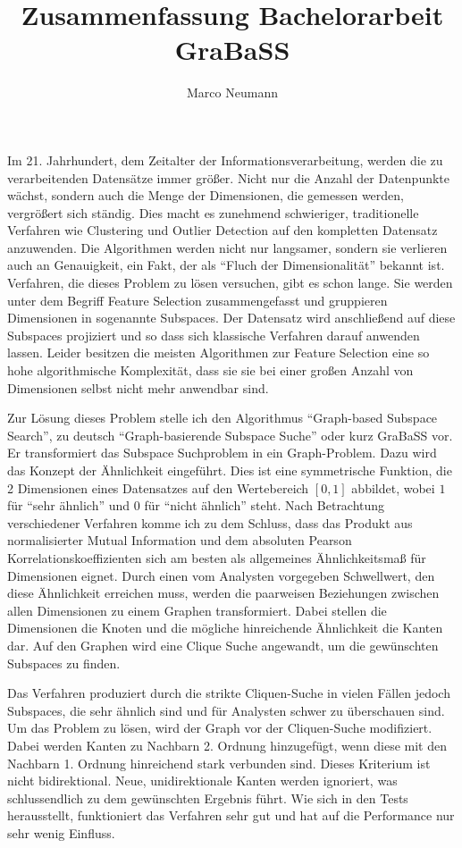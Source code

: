\documentclass{scrartcl}
\title{Zusammenfassung Bachelorarbeit GraBaSS}
\author{Marco Neumann}
\begin{document}
	\maketitle
	Im 21. Jahrhundert, dem Zeitalter der Informationsverarbeitung, werden die zu verarbeitenden Datensätze immer größer. Nicht nur die Anzahl der Datenpunkte wächst, sondern auch die Menge der Dimensionen, die gemessen werden, vergrößert sich ständig. Dies macht es zunehmend schwieriger, traditionelle Verfahren wie Clustering und Outlier Detection auf den kompletten Datensatz anzuwenden. Die Algorithmen werden nicht nur langsamer, sondern sie verlieren auch an Genauigkeit, ein Fakt, der als "`Fluch der Dimensionalität"' bekannt ist. Verfahren, die dieses Problem zu lösen versuchen, gibt es schon lange. Sie werden unter dem Begriff Feature Selection zusammengefasst und gruppieren Dimensionen in sogenannte Subspaces. Der Datensatz wird anschließend auf diese Subspaces projiziert und so dass sich klassische Verfahren darauf anwenden lassen. Leider besitzen die meisten Algorithmen zur Feature Selection eine so hohe algorithmische Komplexität, dass sie sie bei einer großen Anzahl von Dimensionen selbst nicht mehr anwendbar sind.

	Zur Lösung dieses Problem stelle ich den Algorithmus "`Graph-based Subspace Search"', zu deutsch "`Graph-basierende Subspace Suche"' oder kurz GraBaSS vor. Er transformiert das Subspace Suchproblem in ein Graph-Problem. Dazu wird das Konzept der Ähnlichkeit eingeführt. Dies ist eine symmetrische Funktion, die 2 Dimensionen eines Datensatzes auf den Wertebereich $[0,1]$ abbildet, wobei $1$ für "`sehr ähnlich"' und $0$ für "`nicht ähnlich"' steht. Nach Betrachtung verschiedener Verfahren komme ich zu dem Schluss, dass das Produkt aus normalisierter Mutual Information und dem absoluten Pearson Korrelationskoeffizienten sich am besten als allgemeines Ähnlichkeitsmaß für Dimensionen eignet. Durch einen vom Analysten vorgegeben Schwellwert, den diese Ähnlichkeit erreichen muss, werden die paarweisen Beziehungen zwischen allen Dimensionen zu einem Graphen transformiert. Dabei stellen die Dimensionen die Knoten und die mögliche hinreichende Ähnlichkeit die Kanten dar. Auf den Graphen wird eine Clique Suche angewandt, um die gewünschten Subspaces zu finden.

	Das Verfahren produziert durch die strikte Cliquen-Suche in vielen Fällen jedoch Subspaces, die sehr ähnlich sind und für Analysten schwer zu überschauen sind. Um das Problem zu lösen, wird der Graph vor der Cliquen-Suche modifiziert. Dabei werden Kanten zu Nachbarn 2. Ordnung hinzugefügt, wenn diese mit den Nachbarn 1. Ordnung hinreichend stark verbunden sind. Dieses Kriterium ist nicht bidirektional. Neue, unidirektionale Kanten werden ignoriert, was schlussendlich zu dem gewünschten Ergebnis führt. Wie sich in den Tests herausstellt, funktioniert das Verfahren sehr gut und hat auf die Performance nur sehr wenig Einfluss.
\end{document}
